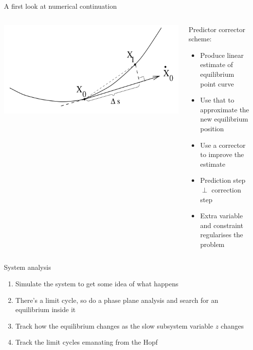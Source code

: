 \documentclass[presentation]{beamer}
\begin{document}
\begin{frame}[label={sec:org2ed4544}]{A first look at numerical continuation}
\begin{columns}
\begin{column}{0.5\columnwidth}
\begin{center}
\includegraphics[width=\textwidth]{./pac.png}
\end{center}
\end{column}

\begin{column}{0.5\columnwidth}
Predictor corrector scheme:
\begin{itemize}
\item Produce linear estimate of equilibrium point curve
\item Use that to approximate the new equilibrium position
\item Use a corrector to improve the estimate
\item Prediction step \(\perp\) correction step
\item Extra variable and constraint regularises the problem
\end{itemize}
\end{column}
\end{columns}
\end{frame}

\begin{frame}[label={sec:orgb17492c}]{System analysis}
\begin{enumerate}
\item Simulate the system to get some idea of what happens
\item There's a limit cycle, so do a phase plane analysis and search for an equilibrium inside it
\item Track how the equilibrium changes as the slow subsystem variable \(z\) changes
\item Track the limit cycles emanating from the Hopf
\end{enumerate}
\end{frame}
\end{document}
